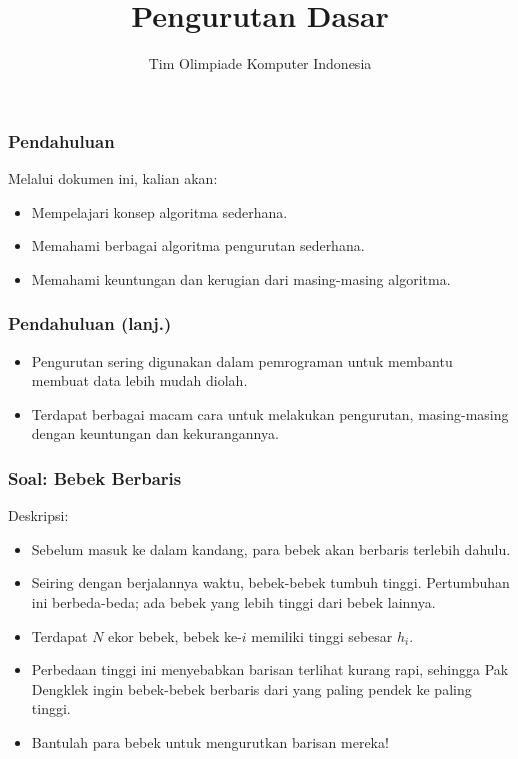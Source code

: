 

\title{Pengurutan Dasar}
\author{Tim Olimpiade Komputer Indonesia}
\date{}



\begin{frame}
\titlepage
\end{frame}

\begin{frame}
\frametitle{Pendahuluan}
Melalui dokumen ini, kalian akan:
\begin{itemize}
  \item Mempelajari konsep algoritma sederhana.
  \item Memahami berbagai algoritma pengurutan sederhana.
  \item Memahami keuntungan dan kerugian dari masing-masing algoritma.
\end{itemize}
\end{frame}

\begin{frame}
\frametitle{Pendahuluan (lanj.)}
\begin{itemize}
  \item Pengurutan sering digunakan dalam pemrograman untuk membantu membuat data lebih mudah diolah.
  \item Terdapat berbagai macam cara untuk melakukan pengurutan,
  masing-masing dengan keuntungan dan kekurangannya.
\end{itemize}
\end{frame}

\begin{frame}
\frametitle{Soal: Bebek Berbaris}
Deskripsi:
\begin{itemize}
  \item Sebelum masuk ke dalam kandang, para bebek akan berbaris terlebih dahulu.
  \item Seiring dengan berjalannya waktu, bebek-bebek tumbuh tinggi. Pertumbuhan ini berbeda-beda; ada bebek yang lebih tinggi dari bebek lainnya.
  \item Terdapat $N$ ekor bebek, bebek ke-$i$ memiliki tinggi sebesar $h_i$.
  \item Perbedaan tinggi ini menyebabkan barisan terlihat kurang rapi, sehingga Pak Dengklek ingin bebek-bebek berbaris dari yang paling pendek ke paling tinggi.
  \item Bantulah para bebek untuk mengurutkan barisan mereka!
\end{itemize}
\end{frame}

